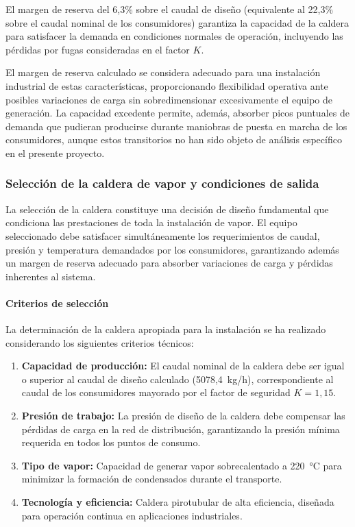 \documentclass[12pt]{article}
\begin{document}
El margen de reserva del 6,3\% sobre el caudal de diseño (equivalente al 22,3\% sobre el caudal nominal de los consumidores) garantiza la capacidad de la caldera para satisfacer la demanda en condiciones normales de operación, incluyendo las pérdidas por fugas consideradas en el factor $K$.

El margen de reserva calculado se considera adecuado para una instalación industrial de estas características, proporcionando flexibilidad operativa ante posibles variaciones de carga sin sobredimensionar excesivamente el equipo de generación. La capacidad excedente permite, además, absorber picos puntuales de demanda que pudieran producirse durante maniobras de puesta en marcha de los consumidores, aunque estos transitorios no han sido objeto de análisis específico en el presente proyecto.

\subsubsection{Selección de la caldera de vapor y condiciones de salida}
\label{subsubsec:seleccion-caldera-vitomax}

La selección de la caldera constituye una decisión de diseño fundamental que condiciona las prestaciones de toda la instalación de vapor. El equipo seleccionado debe satisfacer simultáneamente los requerimientos de caudal, presión y temperatura demandados por los consumidores, garantizando además un margen de reserva adecuado para absorber variaciones de carga y pérdidas inherentes al sistema.

\paragraph{Criterios de selección}

La determinación de la caldera apropiada para la instalación se ha realizado considerando los siguientes criterios técnicos:

\begin{enumerate}[label=\arabic*., leftmargin=2em]
	\item \textbf{Capacidad de producción:} El caudal nominal de la caldera debe ser igual o superior al caudal de diseño calculado (5078,4~kg/h), correspondiente al caudal de los consumidores mayorado por el factor de seguridad $K = 1{,}15$.
	\item \textbf{Presión de trabajo:} La presión de diseño de la caldera debe compensar las pérdidas de carga en la red de distribución, garantizando la presión mínima requerida en todos los puntos de consumo.
	\item \textbf{Tipo de vapor:} Capacidad de generar vapor sobrecalentado a 220~°C para minimizar la formación de condensados durante el transporte.
	\item \textbf{Tecnología y eficiencia:} Caldera pirotubular de alta eficiencia, diseñada para operación continua en aplicaciones industriales.
\end{enumerate}
\end{document}
